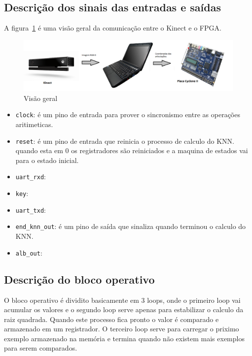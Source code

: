 \documentclass[12pt]{article}
\begin{document}
\subsection{Descrição dos sinais das entradas e saídas}

A figura~\ref{fig:visaogeral} é uma visão geral da comunicação entre o Kinect e
o FPGA.

\begin{figure}[h]
\centering
\includegraphics[width=.5\textwidth]{img/visao_geral}
\caption{Visão geral}
\label{fig:visaogeral}
\end{figure}


\begin{itemize}

\item \verb|clock|: é um pino de entrada para prover o sincronismo entre as
operações aritimeticas.

\item \verb|reset|: é um pino de entrada que reinicia o processo de calculo do
KNN. quando esta em 0 os registradores são reiniciados e a maquina de estados
vai para o estado inicial.

\item \verb|uart_rxd|:

\item \verb|key|:

\item \verb|uart_txd|:

\item \verb|end_knn_out|: é um pino de saída que sinaliza quando 
terminou o calculo do KNN.

\item \verb|alb_out|:

\end{itemize}

\subsection{Descrição do bloco operativo}

O bloco operativo é dividito basicamente em 3 loops, onde o primeiro loop vai
acumular os valores e o segundo loop serve apenas para estabilizar o calculo da
raiz quadrada. Quando este processo fica pronto o valor é comparado e
armazenado em um registrador. O terceiro loop serve para carregar o priximo
exemplo armazenado na memória e termina quando não existem mais exemplos para
serem comparados.
\end{document}
